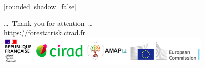 \documentclass[10pt,table,dvipsnames,compress]{beamer}
\begin{document}
{
  [rounded][shadow=false]
  \begin{frame}[plain]
    \begin{block}{}
      \begin{center}
        \ldots~Thank you for attention~\ldots \\
        \url{https://forestatrisk.cirad.fr} \\
        \includegraphics[width=0.8\textwidth]{figs/partners_logos}
      \end{center}
    \end{block}
  \end{frame}
}
\end{document}
